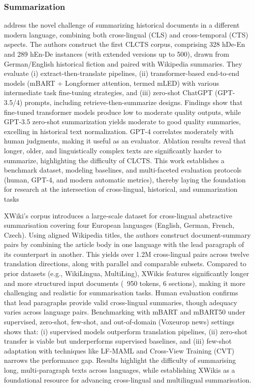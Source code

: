 \documentclass[acmsmall]{acmart}
\begin{document}
 
\subsubsection{Summarization}
\noindent

\citep{zhang2024crosslingualcrosstemporalsummarizationdataset}  address the novel challenge of summarizing historical documents in a different modern language, combining both cross-lingual (CLS) and cross-temporal (CTS) aspects. The authors construct the first CLCTS corpus, comprising 328 hDe-En and 289 hEn-De instances (with extended versions up to 500), drawn from German/English historical fiction and paired with Wikipedia summaries. They evaluate (i) extract-then-translate pipelines, (ii) transformer-based end-to-end models (mBART + Longformer attention, termed mLED) with various intermediate task fine-tuning strategies, and (iii) zero-shot ChatGPT (GPT-3.5/4) prompts, including retrieve-then-summarize designs. Findings show that fine-tuned transformer models produce low to moderate quality outputs, while GPT-3.5 zero-shot summarization yields moderate to good quality summaries, excelling in historical text normalization. GPT-4 correlates moderately with human judgments, making it useful as an evaluator. Ablation results reveal that longer, older, and linguistically complex texts are significantly harder to summarize, highlighting the difficulty of CLCTS. This work establishes a benchmark dataset, modeling baselines, and multi-faceted evaluation protocols (human, GPT-4, and modern automatic metrics), thereby laying the foundation for research at the intersection of cross-lingual, historical, and summarization tasks

\citep{perezbeltrachini2022modelsdatasetscrosslingualsummarisation} XWiki's corpus introduces a large-scale dataset for cross-lingual abstractive summarisation covering four European languages (English, German, French, Czech). Using aligned Wikipedia titles, the authors construct document-summary pairs by combining the article body in one language with the lead paragraph of its counterpart in another. This yields over 1.2M cross-lingual pairs across twelve translation directions, along with parallel and comparable subsets. Compared to prior datasets (e.g., WikiLingua, MultiLing), XWikis features significantly longer and more structured input documents (~950 tokens, 6 sections), making it more challenging and realistic for summarisation tasks. Human evaluation confirms that lead paragraphs provide valid cross-lingual summaries, though adequacy varies across language pairs. Benchmarking with mBART and mBART50 under supervised, zero-shot, few-shot, and out-of-domain (Voxeurop news) settings shows that: (i) supervised models outperform translation pipelines, (ii) zero-shot transfer is viable but underperforms supervised baselines, and (iii) few-shot adaptation with techniques like LF-MAML and Cross-View Training (CVT) narrows the performance gap. Results highlight the difficulty of summarising long, multi-paragraph texts across languages, while establishing XWikis as a foundational resource for advancing cross-lingual and multilingual summarisation.
\end{document}
